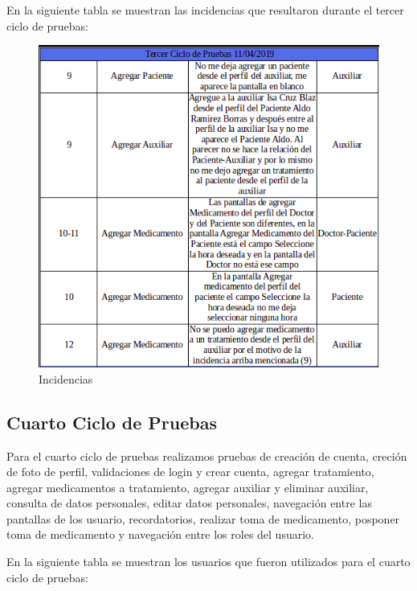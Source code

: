 En la siguiente tabla se muestran las incidencias que resultaron durante el tercer ciclo de pruebas:

\begin{figure}[!htbp]			
	\hypertarget{fig:Incidencia3}{\hspace{1pt}}
	\begin{center}
		\includegraphics[height=0.35\textheight]{Pruebas/images/Inc3}
		\caption{Incidencias}
		\label{fig:Incidencia3}
	\end{center}
\end{figure}

\subsection{Cuarto Ciclo de Pruebas}

Para el cuarto ciclo de pruebas realizamos pruebas de creación de cuenta, creción de foto de perfil, validaciones de login y crear cuenta,   agregar tratamiento, agregar medicamentos a tratamiento, agregar auxiliar y eliminar auxiliar, consulta de datos personales, editar datos personales, navegación entre las pantallas de los usuario, recordatorios, realizar toma de medicamento, posponer toma de medicamento y navegación entre los roles del usuario.

En la siguiente tabla se muestran los usuarios que fueron utilizados para el cuarto ciclo de pruebas:

